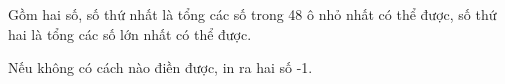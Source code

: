 Gồm hai số, số thứ nhất là tổng các số trong 48 ô nhỏ nhất có thể được, số thứ hai là tổng các số lớn nhất có thể được.  

   Nếu không có cách nào điền được, in ra hai số -1.  

\